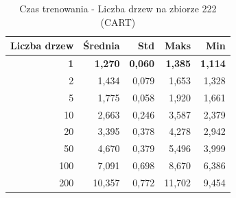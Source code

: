 \begin{table}[htbp]
\centering
\small
\setlength{\tabcolsep}{6pt}
\renewcommand{\arraystretch}{1.2}
\caption{Czas trenowania - Liczba drzew na zbiorze 222 (CART)}
\label{tab:CART_tree_count_222_time}
\begin{tabular}{r|r|r|r|r}
\toprule
Liczba drzew & Średnia & Std & Maks & Min \\
\hline
\textbf{1} & \textbf{1,270} & \textbf{0,060} & \textbf{1,385} & \textbf{1,114} \\
2 & 1,434 & 0,079 & 1,653 & 1,328 \\
5 & 1,775 & 0,058 & 1,920 & 1,661 \\
10 & 2,663 & 0,246 & 3,587 & 2,379 \\
20 & 3,395 & 0,378 & 4,278 & 2,942 \\
50 & 4,670 & 0,379 & 5,496 & 3,999 \\
100 & 7,091 & 0,698 & 8,670 & 6,386 \\
200 & 10,357 & 0,772 & 11,702 & 9,454 \\
\bottomrule
\end{tabular}
\end{table}